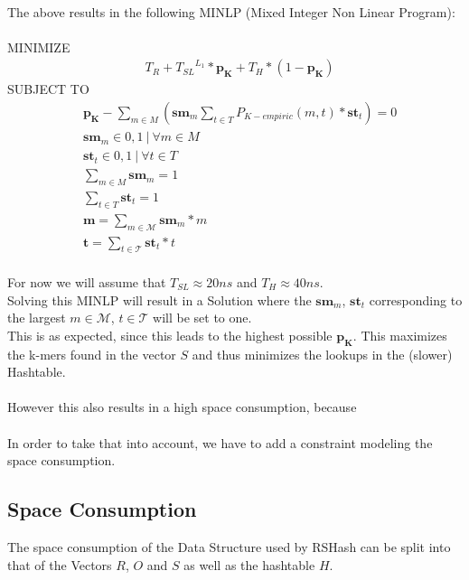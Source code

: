 \documentclass{article}
\newcommand{\timeForCheckInR}{{T_R}}
\newcommand{\timeForLookupInS}{{T_{SL}}}
\newcommand{\timeForHashtable}{{T_H}}
\newcommand{\percKmers}{\textbf{p}_\textbf{K}}
\newcommand{\percKmersEmpiric}{P_{K-empiric}}
\newcommand{\possibleMinimizerLength}{\mathcal{M}}
\newcommand{\possibleThresholds}{\mathcal{T}}
\newcommand{\minimizerLength}{\textbf{m}}
\newcommand{\threshold}{\textbf{t}}
\newcommand{\selectorm}{\textbf{sm}}
\newcommand{\selectort}{\textbf{st}}
\newcommand{\levelOne}{{L_1}}
\begin{document}
\\
The above results in the following MINLP (Mixed Integer Non Linear Program):\\
\\
MINIMIZE
\begin{align*}
	&\timeForCheckInR + \timeForLookupInS^\levelOne * \percKmers + \timeForHashtable * (1-\percKmers)
\end{align*}
SUBJECT TO
\begin{align*}
		&\percKmers - \sum_{m \in M} \left( \selectorm_m \sum_{t \in T} \percKmersEmpiric(m, t) * \selectort_t\right) = 0\\
		&\selectorm_m \in {0,1} ~|~ \forall m \in M \\
		&\selectort_t \in {0,1} ~|~ \forall t \in T \\
		&\sum_{m \in M} \selectorm_m = 1 \\
		&\sum_{t \in T} \selectort_t = 1 \\
		&\minimizerLength = \sum_{m \in \possibleMinimizerLength} \selectorm_m * m \\
		&\threshold = \sum_{t \in \possibleThresholds} \selectort_t * t
\end{align*}
\\
For now we will assume that $\timeForLookupInS \approx 20ns$ and $\timeForHashtable \approx 40ns$.\\
Solving this MINLP will result in a Solution where the $\selectorm_m$, $\selectort_t$ corresponding to the largest $m \in \possibleMinimizerLength$, $t \in \possibleThresholds$ will be set to one.\\
This is as expected, since this leads to the highest possible $\percKmers$. This maximizes the k-mers found in the vector $S$ and thus minimizes the lookups in the (slower) Hashtable.\\
\\
However this also results in a high space consumption, because \\
\\
In order to take that into account, we have to add a constraint modeling the space consumption.\\

\subsection*{Space Consumption}
The space consumption of the Data Structure used by RSHash can be split into that of the Vectors $R$, $O$ and $S$ as well as the hashtable $H$.
\end{document}

